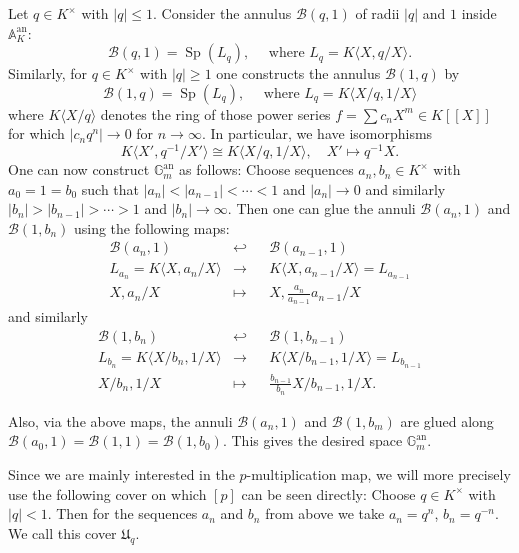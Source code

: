 \documentclass[10pt,oneside]{amsart}
\theoremstyle{definition}
\begin{document}
	Let $q \in K^\times$ with $|q|\leq 1$. Consider the annulus $\mathcal B(q,1)$ of radii $|q|$ and $1$ inside $\mathbb A_K^{\operatorname{an}}$:
	\[\mathcal B(q,1) = \operatorname{Sp}(L_q),\quad \text{ where } L_q = K\langle X,q/X\rangle. \]
	Similarly, for $q\in K^\times$ with $|q|\geq 1$ one constructs the annulus $\mathcal B(1,q)$ by
	\[\mathcal B(1,q) = \operatorname{Sp}(L_{q}),\quad \text{ where } L_{q} = K\langle X/q,1/X\rangle\]
	where $K\langle X/q\rangle$ denotes the ring of those power series $f=\sum c_nX^m\in K[[X]]$ for which $|c_nq^n|\to 0$ for $n\to \infty$. In particular, we have isomorphisms
	 \[K\langle X',q^{-1}/X'\rangle\cong K\langle X/q,1/X\rangle,\quad X'\mapsto q^{-1}X.\]
	One can now construct $\mathbb G_m^{\operatorname{an}}$ as follows: Choose sequences $a_n,b_n\in K^\times$ with $a_0=1=b_0$ such that $|a_n|<|a_{n-1}|<\cdots<1$ and $|a_n| \to 0$ and similarly $|b_n|>|b_{n-1}|>\cdots>1$ and $|b_n| \to \infty$. Then one can glue the annuli $\mathcal B(a_n,1)$ and $\mathcal B(1,b_n)$ using the following maps:
	\begin{equation}\label{torus explicit cover glue map 1}
	\begin{alignedat}{2}
	\mathcal B(a_{n},1)&\hookleftarrow&& \mathcal B(a_{n-1},1)\\
	L_{a_n}=K\langle X,a_n/X\rangle&\rightarrow &&K\langle X,a_{n-1}/X\rangle=L_{a_{n-1}}\\
	X,a_{n}/X&\mapsto&& X, \frac{a_{n}}{a_{n-1}}a_{n-1}/X
	\end{alignedat}
	\end{equation}
	and similarly 
	\begin{equation}\label{torus explicit cover glue map 2}
	\begin{alignedat}{2}
	\mathcal B(1,b_n)&\hookleftarrow&& \mathcal B(1,b_{n-1})\\
	L_{b_n}=K\langle  X/b_{n},1/X\rangle&\rightarrow &&K\langle X/b_{n-1},1/X\rangle=L_{b_{n-1}}\\
	X/b_{n},1/X&\mapsto&& \frac{b_{n-1}}{b_{n}} X/b_{n-1}, 1/X.
	\end{alignedat}
	\end{equation}
	
	Also, via the above maps, the annuli $\mathcal B(a_n,1)$ and $\mathcal B(1,b_m)$ are glued along $\mathcal B(a_0,1)=\mathcal B(1,1)=\mathcal B(1,b_0).$ This gives the desired space $\mathbb{G}_m^{\operatorname{an}}$.
	
	Since we are mainly interested in the $p$-multiplication map, we will more precisely use the following cover on which $[p]$ can be seen directly: Choose $q\in K^\times$ with $|q|<1$. Then for the sequences $a_n$ and $b_n$ from above we take $a_n = q^n$, $b_n = q^{-n}$. 
	We call this cover $\mathfrak U_q$.
	
\end{document}
